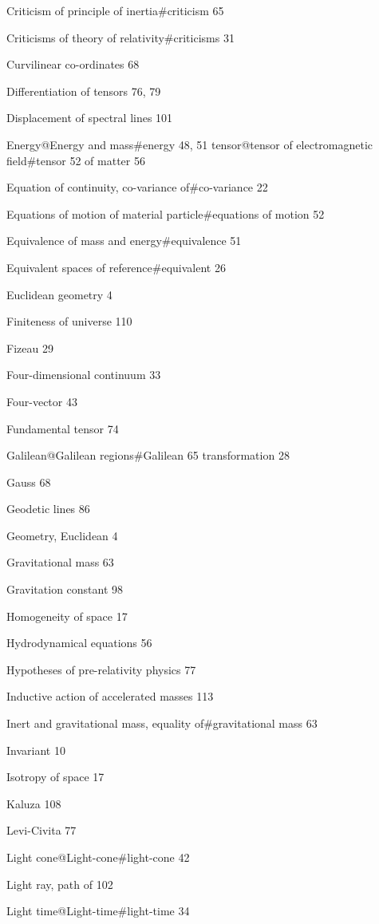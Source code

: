 \documentclass[12pt]{book}[2005/09/16]
\newcommand{\Change}[2]{#2}
\newcommand{\PageSep}[1]{\ignorespaces}
\begin{document}
Criticism of principle of inertia#criticism 65

Criticisms of theory of relativity#criticisms 31

Curvilinear co-ordinates 68

Differentiation of tensors 76, 79

Displacement of spectral lines 101

Energy@{Energy and mass}#energy 48, 51
  tensor@{tensor of electromagnetic field}#tensor 52
    of matter 56

Equation of continuity, co-variance of#co-variance 22

Equations of motion of \Change{materia}{material} particle#equations of motion 52

Equivalence of mass and energy#equivalence 51

Equivalent spaces of reference#equivalent 26

Euclidean geometry 4

Finiteness of universe 110

Fizeau 29

Four-dimensional continuum 33

Four-vector 43

Fundamental tensor 74

Galilean@{Galilean regions}#Galilean 65
  transformation 28

Gauss 68

Geodetic lines 86

Geometry, Euclidean 4

Gravitational mass 63

Gravitation constant 98

Homogeneity of space 17

Hydrodynamical equations 56

Hypotheses of pre-relativity physics 77

Inductive action of accelerated masses 113

Inert and gravitational mass, equality of#gravitational mass 63

Invariant 10 %

Isotropy of space 17

Kaluza 108

Levi-Civita 77

Light cone@{Light-cone}#light-cone 42

Light ray, path of 102

Light time@{Light-time}#light-time 34
\end{document}
